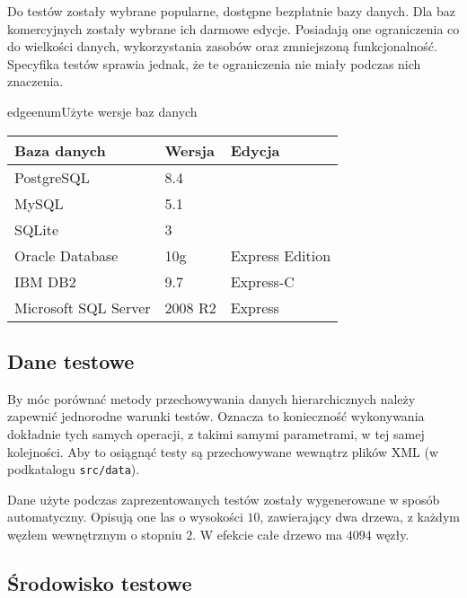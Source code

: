 Do testów zostały wybrane popularne, dostępne bezpłatnie bazy danych. 
Dla baz komercyjnych zostały wybrane ich darmowe edycje. 
Posiadają one ograniczenia co do wielkości danych, wykorzystania zasobów oraz zmniejszoną funkcjonalność. 
Specyfika testów sprawia jednak, że te ograniczenia nie miały podczas nich znaczenia.


\begin{qxtab}{edgeenum}{Użyte wersje baz danych}
\begin{tabular}{l|l|l}
Baza danych                            & Wersja & Edycja \\
\hline
PostgreSQL\index{PostgreSQL}           &  8.4      & \\
MySQL\index{MySQL}                     &  5.1      & \\
SQLite\index{SQLite}                   &  3        & \\
Oracle Database\index{Oracle}          &  10g      & Express Edition \\
IBM DB2\index{IBM DB2}                 &  9.7      & Express-C \\
Microsoft SQL Server\index{SQL Server} &  2008 R2  & Express\\
\end{tabular}
\end{qxtab}


\subsection*{Dane testowe}

By móc porównać metody przechowywania danych hierarchicznych należy zapewnić jednorodne warunki testów.
Oznacza to konieczność wykonywania dokładnie tych samych operacji, z takimi samymi parametrami, w tej samej kolejności.
Aby to osiągnąć testy są przechowywane wewnątrz plików XML (w podkatalogu \verb|src/data|).

Dane użyte podczas zaprezentowanych testów zostały wygenerowane w sposób automatyczny.
Opisują one las o wysokości $10$, zawierający dwa drzewa, 
z każdym węzłem wewnętrznym o stopniu $2$.
W efekcie całe drzewo ma $4094$ węzły.

\subsection*{Środowisko testowe}

